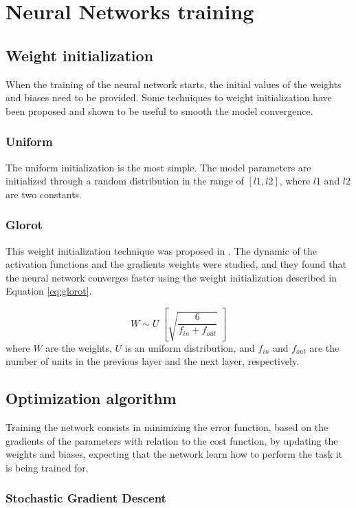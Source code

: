 \section{Neural Networks training}

\subsection{Weight initialization}
When the training of the neural network starts, the initial values of the weights and biases need to be provided. Some techniques to weight initialization have been proposed and shown to be useful to smooth the model convergence.

\subsubsection{Uniform}
The uniform initialization is the most simple. The model parameters are initialized through a random distribution in the range of $[l1, l2]$, where $l1$ and $l2$ are two constants.

\subsubsection{Glorot}
This weight initialization technique was proposed in \cite{glorot2010understanding}. The dynamic of the activation functions and the gradients weights were studied, and they found that the neural network converges faster using the weight initialization described in Equation \ref{eq:glorot}.

\begin{equation}
W \sim U \; \left[\sqrt{\frac{6}{f_{in}+f_{out}}}\; \right] 
\label{eq:glorot}
\end{equation}
where $W$ are the weights, $U$ is an uniform distribution, and $f_{in}$ and $f_{out}$ are the number of units in the previous layer and the next layer, respectively.

\subsection{Optimization algorithm}
Training the network consists in minimizing the error function, based on the gradients of the parameters with relation to the cost function, by updating the weights and biases, expecting that the network learn how to perform the task it is being trained for.

\subsubsection{Stochastic Gradient Descent}

